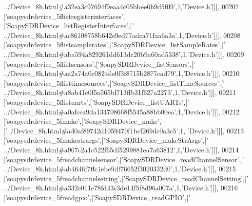 \begin{DoxyCode}
{      ../Device\_8h.html#a32ea3c97694f9eaa4c05bbee6b9d5f09'},1,\textcolor{stringliteral}{'Device.h'}]]],
00207   [\textcolor{stringliteral}{'soapysdrdevice\_5flistregisterinterfaces'},[\textcolor{stringliteral}{'SoapySDRDevice\_listRegisterInterfaces'},[\textcolor{stringliteral}{'
      ../Device\_8h.html#ac86108758b642e9ed77adca71faa6a3a'},1,\textcolor{stringliteral}{'Device.h'}]]],
00208   [\textcolor{stringliteral}{'soapysdrdevice\_5flistsamplerates'},[\textcolor{stringliteral}{'SoapySDRDevice\_listSampleRates'},[\textcolor{stringliteral}{'
      ../Device\_8h.html#aba594a829261dd613dc20b9a60ad5338'},1,\textcolor{stringliteral}{'Device.h'}]]],
00209   [\textcolor{stringliteral}{'soapysdrdevice\_5flistsensors'},[\textcolor{stringliteral}{'SoapySDRDevice\_listSensors'},[\textcolor{stringliteral}{'
      ../Device\_8h.html#aa2a74a0c0824de0f3f8715b2877cad79'},1,\textcolor{stringliteral}{'Device.h'}]]],
00210   [\textcolor{stringliteral}{'soapysdrdevice\_5flisttimesources'},[\textcolor{stringliteral}{'SoapySDRDevice\_listTimeSources'},[\textcolor{stringliteral}{'
      ../Device\_8h.html#a8ab41c0f5a565bf713ffb31f627a2273'},1,\textcolor{stringliteral}{'Device.h'}]]],
00211   [\textcolor{stringliteral}{'soapysdrdevice\_5flistuarts'},[\textcolor{stringliteral}{'SoapySDRDevice\_listUARTs'},[\textcolor{stringliteral}{'
      ../Device\_8h.html#a0afcea9da134708668f5545a88bb00ea'},1,\textcolor{stringliteral}{'Device.h'}]]],
00212   [\textcolor{stringliteral}{'soapysdrdevice\_5fmake'},[\textcolor{stringliteral}{'SoapySDRDevice\_make'},[\textcolor{stringliteral}{'../Device\_8h.html#ad0af89742d1059470f1bcf269dc0a3c5'},1,\textcolor{stringliteral}{
      'Device.h'}]]],
00213   [\textcolor{stringliteral}{'soapysdrdevice\_5fmakestrargs'},[\textcolor{stringliteral}{'SoapySDRDevice\_makeStrArgs'},[\textcolor{stringliteral}{'
      ../Device\_8h.html#a967c2a1c522f65df5299881ea7a63812'},1,\textcolor{stringliteral}{'Device.h'}]]],
00214   [\textcolor{stringliteral}{'soapysdrdevice\_5freadchannelsensor'},[\textcolor{stringliteral}{'SoapySDRDevice\_readChannelSensor'},[\textcolor{stringliteral}{'
      ../Device\_8h.html#ab4646f7ffc1ebe9df76652f3020332d0'},1,\textcolor{stringliteral}{'Device.h'}]]],
00215   [\textcolor{stringliteral}{'soapysdrdevice\_5freadchannelsetting'},[\textcolor{stringliteral}{'SoapySDRDevice\_readChannelSetting'},[\textcolor{stringliteral}{'
      ../Device\_8h.html#a332e011e78fd43c3de14f5f8d96a007a'},1,\textcolor{stringliteral}{'Device.h'}]]],
00216   [\textcolor{stringliteral}{'soapysdrdevice\_5freadgpio'},[\textcolor{stringliteral}{'SoapySDRDevice\_readGPIO'},[\textcolor{stringliteral}{'
}
\end{DoxyCode}
